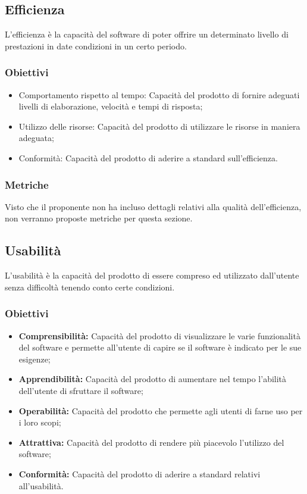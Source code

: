 \subsection{Efficienza}
L'efficienza è la capacità del software di poter offrire un determinato livello di prestazioni in date condizioni in un certo periodo.
\subsubsection{Obiettivi}
\begin{itemize}
	\item Comportamento rispetto al tempo: Capacità del prodotto di fornire adeguati livelli di elaborazione, velocità e tempi di risposta;
	\item Utilizzo delle risorse: Capacità del prodotto di utilizzare le risorse in maniera adeguata;
	\item Conformità: Capacità del prodotto di aderire a standard sull'efficienza.
\end{itemize}
\subsubsection{Metriche}
Visto che il proponente non ha incluso dettagli relativi alla qualità dell'efficienza, non verranno proposte metriche per questa sezione.

\subsection{Usabilità}
L'usabilità è la capacità del prodotto di essere compreso ed utilizzato dall'utente senza difficoltà tenendo conto certe condizioni.

\subsubsection{Obiettivi}
\begin{itemize}
	\item \textbf{Comprensibilità:} Capacità del prodotto di visualizzare le varie funzionalità del software e permette all'utente di capire se il software è indicato per le sue esigenze;
	\item \textbf{Apprendibilità:} Capacità del prodotto di aumentare nel tempo l'abilità dell'utente di sfruttare il software;
	\item \textbf{Operabilità:} Capacità del prodotto che permette agli utenti di farne uso per i loro scopi;
	\item \textbf{Attrattiva:} Capacità del prodotto di rendere più piacevolo l'utilizzo del software;
	\item \textbf{Conformità:} Capacità del prodotto di aderire a standard relativi all'usabilità.
\end{itemize}

